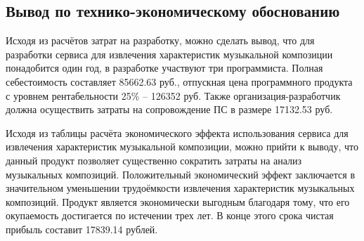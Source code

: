 \subsection{Вывод по технико-экономическому обоснованию}
\label{sec:economics:conclusion}
Исходя из расчётов затрат на разработку, можно сделать вывод, что для разработки сервиса для извлечения характеристик музыкальной композиции понадобится один год, в разработке участвуют три программиста. Полная себестоимость составляет 85662.63 руб., отпускная цена программного продукта с уровнем рентабельности 25\% -- 126352 руб. Также организация-разработчик должна осуществить затраты на сопровождение ПС в размере 17132.53 руб.

Исходя из таблицы расчёта экономического эффекта использования сервиса для извлечения характеристик музыкальной композиции, можно \linebreak прийти к выводу, что данный продукт позволяет существенно сократить затраты на анализ музыкальных композиций. Положительный экономический эффект заключается в значительном уменьшении трудоёмкости извлечения характеристик музыкальных композиций. Продукт является экономически выгодным благодаря тому, что его окупаемость достигается по истечении трех лет. В конце этого срока чистая прибыль составит 17839.14 рублей.

